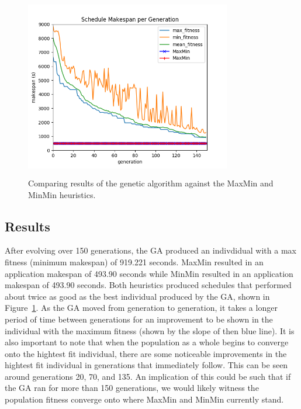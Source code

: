 \begin{figure}[H]
  \centering
  \includegraphics[width=90mm, height=80mm]{figures/results.png}
  \caption{Comparing results of the genetic algorithm against the MaxMin and MinMin heuristics.}
  \label{fig:results}
\end{figure}

\subsection*{Results}
After evolving over 150 generations, the GA produced an indivdidual with a
max fitness (minimum makespan) of 919.221 seconds. MaxMin resulted in an
application makespan of 493.90 seconds while MinMin resulted in an application
makespan of 493.90 seconds. Both heuristics produced schedules that performed
about twice as good as the best individual produced by the GA, shown in
Figure~\ref{fig:results}. As the GA moved from generation to generation, it
takes a longer period of time between generations for an improvement to be
shown in the individual with the maximum fitness (shown by the slope of then blue line). It is also important to note
that when the population as a whole begins to converge onto the hightest fit
individual, there are some noticeable improvements in the hightest fit
individual in generations that immediately follow. This can be seen around generations 20, 70, and 135. An implication
of this could be such that if the GA ran for more than 150 generations, we
would likely witness the population fitness converge onto where MaxMin and MinMin
currently stand.
